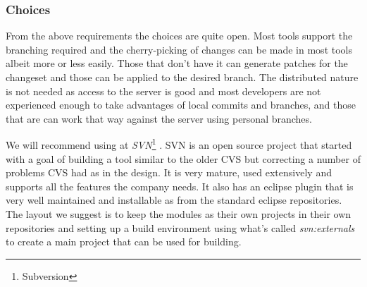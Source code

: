 \documentclass[a4paper,11pt]{article}
\begin{document}
\subsubsection{Choices}
From the above requirements the choices are quite open. Most tools support the
branching required and the cherry-picking of changes can be made in most tools
albeit more or less easily. Those that don't have it can generate patches for
the changeset and those can be applied to the desired branch. The distributed
nature is not needed as access to the server is good and most developers are not
experienced enough to take advantages of local commits and branches, and those
that are can work that way against the server using personal branches. 

We will recommend using at \emph{SVN}\footnote{Subversion} \cite{SVN}. SVN is
an open source project that started with a goal of building a tool similar to
the older CVS but correcting a number of problems CVS had as in the design. It
is very mature, used extensively and supports all the features the company
needs. It also has an eclipse plugin that is very well maintained and
installable as from the standard eclipse repositories. The layout we suggest is
to keep the modules as their own projects in their own repositories and setting
up a build environment using what's called \emph{svn:externals} to create a main
project that can be used for building.




\end{document}
